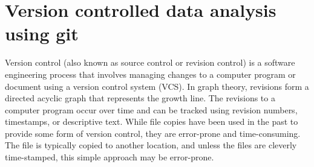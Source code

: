 \documentclass[12pt,twoside]{reedthesis}
\begin{document}
\hypertarget{m1}{%
\section*{Version controlled data analysis using git}\label{m1}}

Version control (also known as source control or revision control) is a
software engineering process that involves managing changes to a
computer program or document using a version control system (VCS). In
graph theory, revisions form a directed acyclic graph that represents
the growth line. The revisions to a computer program occur over time and
can be tracked using revision numbers, timestamps, or descriptive text.
While file copies have been used in the past to provide some form of
version control, they are error-prone and time-consuming. The file is
typically copied to another location, and unless the files are cleverly
time-stamped, this simple approach may be error-prone.
\end{document}
